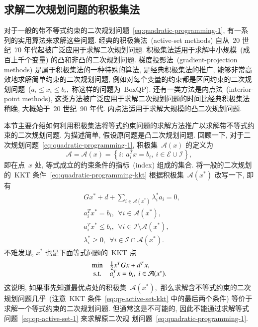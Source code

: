 \subsection{求解二次规划问题的积极集法}
\label{subsec:7.2.2}

对于一般的带不等式约束的二次规划问题~\eqref{eq:quadratic-programming-1}, 有一系列的实用算法来求解这些问题. 经典的积极集法~(active-set methods) 自从~20 世纪~70 年代起被广泛应用于求解二次规划问题. 积极集法适用于求解中小规模~(成百上千个变量) 的凸和非凸的二次规划问题. 梯度投影法~(gradient-projection methods) 是属于积极集法的一种特殊的算法, 是经典积极集法的推广, 能够非常高效地求解简单约束的二次规划问题, 例如对每个变量的约束都是区间约束的二次规划问题~($a_i \leqslant x_i \leqslant b_i,$ 称这样的问题为~BoxQP). 还有一类方法是内点法~(interior-point methods), 这类方法被广泛应用于求解二次规划问题的时间比经典积极集法稍晚, 大概始于~20 世纪~90 年代. 内点法适用于求解大规模的凸二次规划问题.

本节主要介绍如何利用积极集法将等式约束问题的求解方法推广以求解带不等式约束的二次规划问题. 为描述简单, 假设原问题是凸二次规划问题. 回顾一下, 对于二次规划问题~\eqref{eq:quadratic-programming-1}, 积极集~$\mathcal{A}(x)$ 的定义为
\begin{equation}
\label{eq:qp-active-set}
\mathcal{A} = \mathcal{A}({x}) = \left\{ i : ~ {a}_i^T {x} = b_i, ~ i \in \mathcal{E} \cup \mathcal{I} \right\},
\end{equation}
即在点~${x}$ 处, 等式成立的约束条件的指标~(index) 组成的集合.
将一般的二次规划的~KKT 条件~\eqref{eq:quadratic-programming-kkt} 根据积极集~$\mathcal{A}({x}^*)$ 改写一下, 即有
\begin{equation}
\label{eq:qp-active-set-kkt}
\begin{aligned}
& G {x}^* + d + \sum\limits_{i \in \mathcal{A}({x}^*)} \lambda_i^* {a}_i = {0}, \\
& {a}_i^T {x}^* = b_i, ~~ \forall i \in \mathcal{A}({x}^*), \\
& {a}_i^T {x}^* \leqslant b_i, ~~ \forall i \in \mathcal{I} \setminus \mathcal{A}({x}^*), \\
& \lambda_i^* \geqslant 0, ~~ \forall i \in \mathcal{I} \cap \mathcal{A}({x}^*).
\end{aligned}
\end{equation}
不难发现, ${x}^*$ 也是下面等式问题的~KKT 点
\begin{equation}
\label{eq:qp-active-set-1}
\begin{array}{cl}
\min & \frac{1}{2} {x}^T G {x} + {d}^T {x}, \\
{\rm s.t.} & {a}_i^T {x} = b_i, ~ i \in \mathcal{A}({x}^*).
\end{array}
\end{equation}
这说明, 如果事先知道最优点处的积极集~$\mathcal{A}({x}^*),$ 那么求解含不等式约束的二次规划问题几乎~(注意~KKT 条件~\eqref{eq:qp-active-set-kkt} 中的最后两个条件) 等价于求解一个等式约束的二次规划问题. 但通常这是不可能的, 因此不能通过求解等式问题~\eqref{eq:qp-active-set-1} 来求解原二次规
划问题~\eqref{eq:quadratic-programming-1}.

